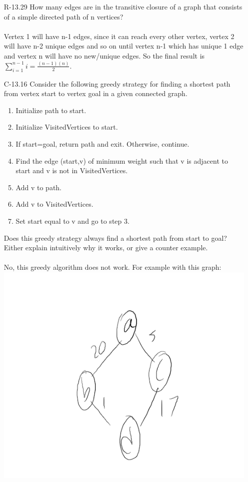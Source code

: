 \begin{itemize}
      \item [R-13.29] How many edges are in the transitive closure of a graph that consists of a
            simple directed path of n vertices?\\
            \answer\\
            Vertex 1 will have n-1 edges, since it can reach every other vertex, vertex 2 will have n-2 unique edges and so on
            until vertex n-1 which has unique 1 edge and vertex n will have no new/unique edges. So the final result is
            $\sum_{i=1}^{n-1} i = \frac{(n-1)(n)}{2}$.
      \item[C-13.16] Consider the following greedy strategy for finding a shortest path from
            vertex start to vertex goal in a given connected graph.
            \begin{enumerate}
                  \item Initialize path to start.
                  \item Initialize VisitedVertices to {start}.
                  \item If start=goal, return path and exit. Otherwise, continue.
                  \item Find the edge (start,v) of minimum weight such that v is adjacent to start and v is not in VisitedVertices.
                  \item Add v to path.
                  \item Add v to VisitedVertices.
                  \item Set start equal to v and go to step 3.
            \end{enumerate}
            Does this greedy strategy always find a shortest path from start to goal?
            Either explain intuitively why it works, or give a counter example.\\
            \answer \\
            No, this greedy algorithm does not work. For example with this graph: \\
            \includegraphics[scale =.7]{img/C-13_16.png} \\

\end{itemize}
